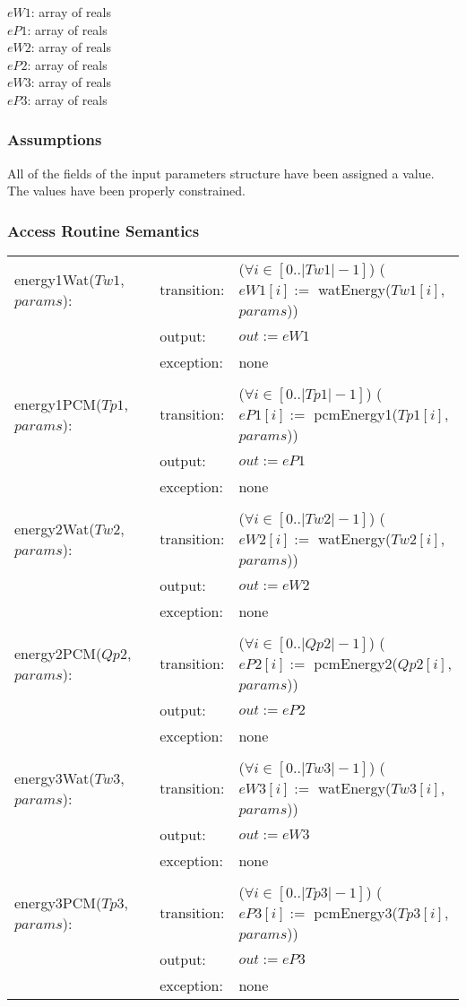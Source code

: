 \documentclass[12pt]{article}
\begin{document}
$eW1$: array of reals \\
$eP1$: array of reals \\
$eW2$: array of reals \\
$eP2$: array of reals \\
$eW3$: array of reals \\
$eP3$: array of reals 

\subsubsection{Assumptions}

All of the fields of the input parameters structure have been assigned a value. The values have been properly constrained.

\subsubsection{Access Routine Semantics}
\begin{center}
\begin{tabular}{l l p{6cm}}
energy1Wat($Tw1$, $params$): & transition: & ($\forall i \in [0..|Tw1| - 1]$) ($eW1[i] :=$ watEnergy($Tw1[i]$, $params$)) \\
& output: & $out := eW1$ \\ 
& exception: & none \\ \\
energy1PCM($Tp1$, $params$): & transition: & ($\forall i \in [0..|Tp1| - 1]$) ($eP1[i]:=$ pcmEnergy1($Tp1[i]$, $params$)) \\
& output: & $out := eP1$ \\ 
& exception: & none \\ \\
energy2Wat($Tw2$, $params$): & transition: & ($\forall i \in [0..|Tw2| - 1]$) ($eW2[i] :=$ watEnergy($Tw2[i]$, $params$)) \\
& output: & $out := eW2$ \\ 
& exception: & none \\ \\
energy2PCM($Qp2$, $params$): & transition: & ($\forall i \in [0..|Qp2| - 1]$) ($eP2[i] :=$ pcmEnergy2($Qp2[i]$, $params$)) \\
& output: & $out := eP2$ \\ 
& exception: & none \\ \\
energy3Wat($Tw3$, $params$): & transition: & ($\forall i \in [0..|Tw3| - 1]$) ($eW3[i] :=$ watEnergy($Tw3[i]$, $params$)) \\
& output: & $out := eW3$ \\ 
& exception: & none \\ \\
energy3PCM($Tp3$, $params$): & transition: & ($\forall i \in [0..|Tp3| - 1]$) ($eP3[i] :=$ pcmEnergy3($Tp3[i]$, $params$)) \\
& output: & $out := eP3$ \\
& exception: & none \\
\end{tabular}
\end{center}
\end{document}
